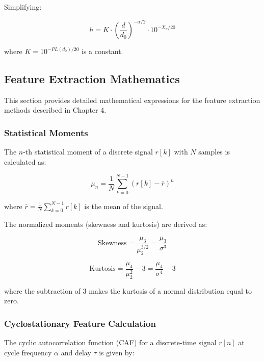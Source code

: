 Simplifying:

\begin{equation}
    h = K \cdot \left(\frac{d}{d_0}\right)^{-\alpha/2} \cdot 10^{-X_\sigma/20}
\end{equation}

where $K = 10^{-PL(d_0)/20}$ is a constant.

\subsection{Feature Extraction Mathematics}
\label{app:feature_math}

This section provides detailed mathematical expressions for the feature extraction methods described in Chapter 4.

\subsubsection{Statistical Moments}

The $n$-th statistical moment of a discrete signal $r[k]$ with $N$ samples is calculated as:

\begin{equation}
    \mu_n = \frac{1}{N}\sum_{k=0}^{N-1}(r[k] - \bar{r})^n
\end{equation}

where $\bar{r} = \frac{1}{N}\sum_{k=0}^{N-1}r[k]$ is the mean of the signal.

The normalized moments (skewness and kurtosis) are derived as:

\begin{equation}
    \text{Skewness} = \frac{\mu_3}{\mu_2^{3/2}} = \frac{\mu_3}{\sigma^3}
\end{equation}

\begin{equation}
    \text{Kurtosis} = \frac{\mu_4}{\mu_2^2} - 3 = \frac{\mu_4}{\sigma^4} - 3
\end{equation}

where the subtraction of 3 makes the kurtosis of a normal distribution equal to zero.

\subsubsection{Cyclostationary Feature Calculation}

The cyclic autocorrelation function (CAF) for a discrete-time signal $r[n]$ at cycle frequency $\alpha$ and delay $\tau$ is given by:

